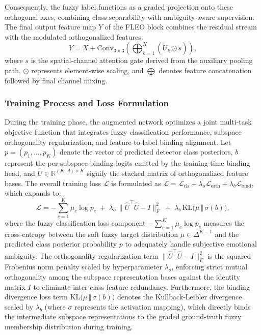 Consequently, the fuzzy label functions as a graded projection onto these orthogonal axes, combining class separability with ambiguity-aware supervision. The final output feature map $Y$ of the FLEO block combines the residual stream with the modulated orthogonalized features:
\begin{equation}
Y = X + \text{Conv}_{3\times3}\left( \bigoplus_{k=1}^{K} \left( \tilde{U}_k \odot s \right) \right),
\label{eq:fleo_output}
\end{equation}
where $s$ is the spatial-channel attention gate derived from the auxiliary pooling path, $\odot$ represents element-wise scaling, and $\bigoplus$ denotes feature concatenation followed by final channel mixing.

\subsubsection{Training Process and Loss Formulation}

During the training phase, the augmented network optimizes a joint multi-task objective function that integrates fuzzy classification performance, subspace orthogonality regularization, and feature-to-label binding alignment. Let $p = (p_1, \dots, p_K)$ denote the vector of predicted detector class posteriors, $b$ represent the per-subspace binding logits emitted by the training-time binding head, and $\hat{U} \in \mathbb{R}^{(K \cdot d) \times K}$ signify the stacked matrix of orthogonalized feature bases. The overall training loss $\mathcal{L}$ is formulated as $\mathcal{L} = \mathcal{L}_{\text{cls}} + \lambda_{o} \mathcal{L}_{\text{orth}} + \lambda_{b} \mathcal{L}_{\text{bind}}$, which expands to:
\begin{equation}
\mathcal{L} = -\sum_{c=1}^{K}\mu_c\log p_c
\;+\;\lambda_{o}\,\bigl\lVert\hat{U}^{\!\top}\hat{U}-I\bigr\rVert_F^{2}
\;+\;\lambda_{b}\,\mathrm{KL}\!\bigl(\mu\,\Vert\,\sigma(b)\bigr),
\label{eq:fuzzyloss}
\end{equation}
where the fuzzy classification loss component $-\sum_{c=1}^{K}\mu_c\log p_c$ measures the cross-entropy between the soft fuzzy target distribution $\mu \in \Delta^{K-1}$ and the predicted class posterior probability $p$ to adequately handle subjective emotional ambiguity. The orthogonality regularization term $\bigl\lVert\hat{U}^{\!\top}\hat{U}-I\bigr\rVert_F^2$ is the squared Frobenius norm penalty scaled by hyperparameter $\lambda_{o}$, enforcing strict mutual orthogonality among the subspace representation bases against the identity matrix $I$ to eliminate inter-class feature redundancy. Furthermore, the binding divergence loss term $\mathrm{KL}\bigl(\mu\,\Vert\,\sigma(b)\bigr)$ denotes the Kullback-Leibler divergence scaled by $\lambda_{b}$ (where $\sigma$ represents the activation mapping), which directly binds the intermediate subspace representations to the graded ground-truth fuzzy membership distribution during training.

